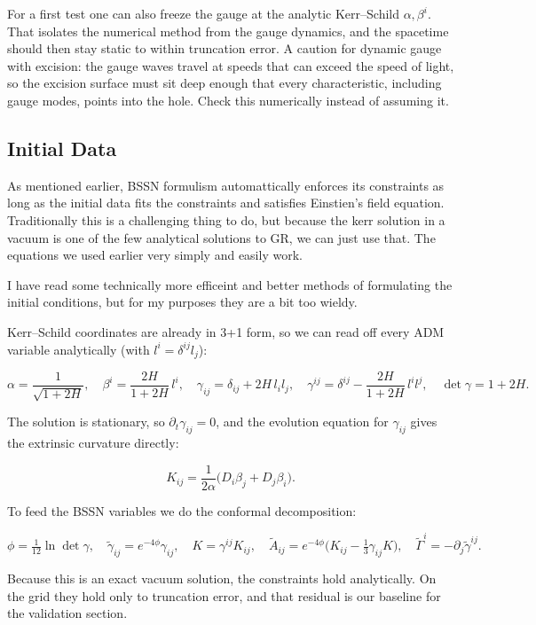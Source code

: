 For a first test one can also freeze the gauge at the analytic Kerr--Schild $\alpha,\beta^i$.
That isolates the numerical method from the gauge dynamics, and the spacetime should
then stay static to within truncation error. A caution for dynamic gauge with excision: the
gauge waves travel at speeds that can exceed the speed of light, so the excision
surface must sit deep enough that every characteristic, including gauge modes, points
into the hole. Check this numerically instead of assuming it.


\subsection{Initial Data}

As mentioned earlier, BSSN formulism automattically enforces its constraints as long as the initial data fits the constraints and satisfies Einstien's field equation. Traditionally this is a challenging thing to do, but because the kerr solution in a vacuum is one of the few analytical solutions to GR, we can just use that. The equations we used earlier very simply and easily work.

I have read some technically more efficeint and better methods of formulating the initial conditions, but for my purposes they are a bit too wieldy.

Kerr--Schild coordinates are already in 3+1 form, so we can read off every ADM variable
analytically (with $l^i=\delta^{ij}l_j$):

\[
	\alpha=\frac{1}{\sqrt{1+2H}},\quad
	\beta^i=\frac{2H}{1+2H}\,l^i,\quad
	\gamma_{ij}=\delta_{ij}+2H\,l_il_j,\quad
	\gamma^{ij}=\delta^{ij}-\frac{2H}{1+2H}\,l^il^j,\quad
	\det\gamma=1+2H.
\]

The solution is stationary, so $\partial_t\gamma_{ij}=0$, and the evolution equation for
$\gamma_{ij}$ gives the extrinsic curvature directly:

\[
	K_{ij}=\frac{1}{2\alpha}\big(D_i\beta_j+D_j\beta_i\big).
\]

To feed the BSSN variables we do the conformal decomposition:

\[
	\phi=\tfrac1{12}\ln\det\gamma,\quad \tilde\gamma_{ij}=e^{-4\phi}\gamma_{ij},\quad
	K=\gamma^{ij}K_{ij},\quad \tilde A_{ij}=e^{-4\phi}\big(K_{ij}-\tfrac13\gamma_{ij}K\big),\quad
	\tilde\Gamma^i=-\partial_j\tilde\gamma^{ij}.
\]

Because this is an exact vacuum solution, the constraints hold analytically. On the grid
they hold only to truncation error, and that residual is our baseline for the
validation section.


